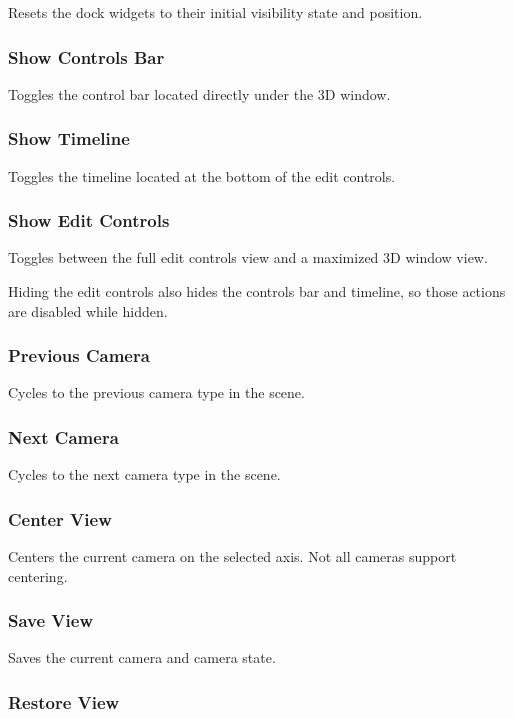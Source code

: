 \documentclass[10pt, a4paper, titlepage, oneside]{article}
\begin{document}
Resets the dock widgets to their initial visibility state and position.

\subsubsection{Show Controls Bar}

Toggles the control bar located directly under the 3D window.

\subsubsection{Show Timeline}

Toggles the timeline located at the bottom of the edit controls.

\subsubsection{Show Edit Controls}

Toggles between the full edit controls view and a maximized 3D window view.

Hiding the edit controls also hides the controls bar and timeline, so those actions are disabled while hidden.

\subsubsection{Previous Camera}

Cycles to the previous camera type in the scene.

\subsubsection{Next Camera}

Cycles to the next camera type in the scene.

\subsubsection{Center View}

Centers the current camera on the selected axis. Not all cameras support centering.

\subsubsection{Save View}

Saves the current camera and camera state.

\subsubsection{Restore View}
\end{document}
